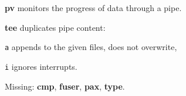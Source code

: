 \begin{enumx}
	\item [\cmdblack] \textbf{pv} monitors the progress of data through a pipe.
\end{enumx}

\begin{enumx}
	\item [\cmdblack] \textbf{tee} duplicates pipe content: %
	\item [\texttt{a}] appends to the given files, does not overwrite,
	\item [\texttt{i}] ignores interrupts.
\end{enumx}

\begin{enumx}
	\item [\cmd] Missing: \textbf{cmp}, \textbf{fuser}, \textbf{pax}, \textbf{type}.
\end{enumx}
